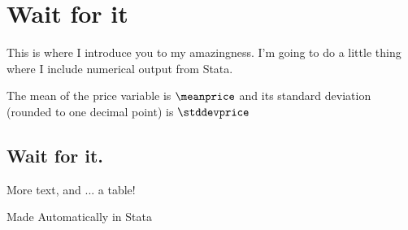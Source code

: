 \documentclass[11pt]{article} %
\title{}
\author{Garret Christensen}
\begin{document}

\maketitle

\section{Wait for it}

This is where I introduce you to my amazingness.
I'm going to do a little thing where I include numerical output from Stata.

The mean of the price variable is $\meanprice$ and its standard deviation (rounded to one decimal point) is $\stddevprice$

\subsection{Wait for it.}

More text, and ... a table! 

\begin{table}
\caption{Made Automatically in Stata}
\end{table}

\end{document}
